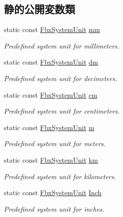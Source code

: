 \subsection*{静的公開変数類}
\begin{DoxyCompactItemize}
\item 
static const \hyperlink{class_fbx_system_unit}{Fbx\+System\+Unit} \hyperlink{class_fbx_system_unit_aac172547aa34bdc8d71d6c5668262c25}{mm}
\begin{DoxyCompactList}\small\item\em Predefined system unit for millimeters. \end{DoxyCompactList}\item 
static const \hyperlink{class_fbx_system_unit}{Fbx\+System\+Unit} \hyperlink{class_fbx_system_unit_a8448652c675044fb54506a4044f72814}{dm}
\begin{DoxyCompactList}\small\item\em Predefined system unit for decimeters. \end{DoxyCompactList}\item 
static const \hyperlink{class_fbx_system_unit}{Fbx\+System\+Unit} \hyperlink{class_fbx_system_unit_a2938b6feaf5711daea463071e89d073e}{cm}
\begin{DoxyCompactList}\small\item\em Predefined system unit for centimeters. \end{DoxyCompactList}\item 
static const \hyperlink{class_fbx_system_unit}{Fbx\+System\+Unit} \hyperlink{class_fbx_system_unit_ad769a9a9b50605abe42d500ac7c99d28}{m}
\begin{DoxyCompactList}\small\item\em Predefined system unit for meters. \end{DoxyCompactList}\item 
static const \hyperlink{class_fbx_system_unit}{Fbx\+System\+Unit} \hyperlink{class_fbx_system_unit_abc5367c578e2fe6975baae0ffbff2d63}{km}
\begin{DoxyCompactList}\small\item\em Predefined system unit for kilometers. \end{DoxyCompactList}\item 
static const \hyperlink{class_fbx_system_unit}{Fbx\+System\+Unit} \hyperlink{class_fbx_system_unit_a88862a2baeb2e510e1f39ef9d09aa0c4}{Inch}
\begin{DoxyCompactList}\small\item\em Predefined system unit for inches. \end{DoxyCompactList}\item 

\end{DoxyCompactItemize}
